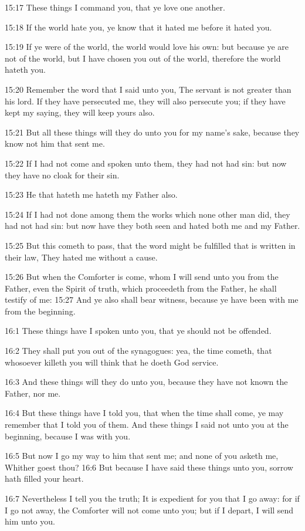15:17 These things I command you, that ye love one another.

15:18 If the world hate you, ye know that it hated me before it hated
you.

15:19 If ye were of the world, the world would love his own: but
because ye are not of the world, but I have chosen you out of the
world, therefore the world hateth you.

15:20 Remember the word that I said unto you, The servant is not
greater than his lord. If they have persecuted me, they will also
persecute you; if they have kept my saying, they will keep yours also.

15:21 But all these things will they do unto you for my name's sake,
because they know not him that sent me.

15:22 If I had not come and spoken unto them, they had not had sin:
but now they have no cloak for their sin.

15:23 He that hateth me hateth my Father also.

15:24 If I had not done among them the works which none other man did,
they had not had sin: but now have they both seen and hated both me
and my Father.

15:25 But this cometh to pass, that the word might be fulfilled that
is written in their law, They hated me without a cause.

15:26 But when the Comforter is come, whom I will send unto you from
the Father, even the Spirit of truth, which proceedeth from the
Father, he shall testify of me: 15:27 And ye also shall bear witness,
because ye have been with me from the beginning.

16:1 These things have I spoken unto you, that ye should not be
offended.

16:2 They shall put you out of the synagogues: yea, the time cometh,
that whosoever killeth you will think that he doeth God service.

16:3 And these things will they do unto you, because they have not
known the Father, nor me.

16:4 But these things have I told you, that when the time shall come,
ye may remember that I told you of them. And these things I said not
unto you at the beginning, because I was with you.

16:5 But now I go my way to him that sent me; and none of you asketh
me, Whither goest thou?  16:6 But because I have said these things
unto you, sorrow hath filled your heart.

16:7 Nevertheless I tell you the truth; It is expedient for you that I
go away: for if I go not away, the Comforter will not come unto you;
but if I depart, I will send him unto you.

